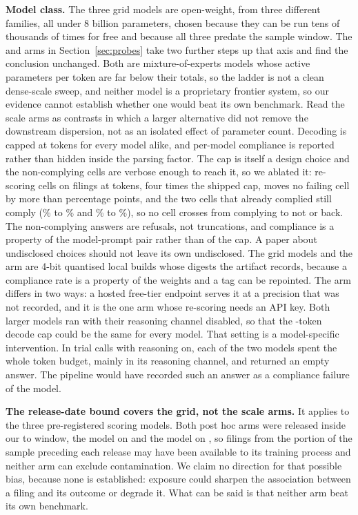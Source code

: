 \documentclass[sigconf]{acmart}
\begin{document}
\textbf{Model class.} The three grid models are open-weight, from three different families, all
under 8 billion parameters, chosen because they can be run tens of thousands of times for free and
because all three predate the sample window. The
\ScaleParams{} and \BigParams{} arms in Section~\ref{sec:probes} take two further steps up that axis
and find the conclusion unchanged. Both are mixture-of-experts models whose active parameters per
token are far below their totals, so the ladder is not a clean dense-scale sweep, and neither model
is a proprietary frontier system, so our evidence cannot establish whether one would beat its own
benchmark. Read the scale arms as contrasts in which a larger alternative did not remove the
downstream dispersion, not as an isolated effect of parameter count.
Decoding is capped at \NumPredict{} tokens for every model alike, and per-model compliance is
reported rather than hidden inside the parsing factor. The cap is itself a design choice and the
non-complying cells are verbose enough to reach it, so we ablated it: re-scoring \CapNumCells{}
cells on \CapProbeN{} filings at \CapProbeHigh{} tokens, four times the shipped cap,
moves no failing cell by more than \CapMaxMove{} percentage points, and the two cells that already
complied still comply (\CapControlLow{}\% to \CapControlHigh{}\% and \CapControlTwoLow{}\% to
\CapControlTwoHigh{}\%), so no cell crosses from complying to not or back. The non-complying answers
are refusals, not truncations, and compliance is a property of the model-prompt pair rather than of
the cap. A paper about undisclosed choices should not leave its own undisclosed. The grid models and the \ScaleParams{} arm
are 4-bit quantised local builds whose digests the artifact records, because a compliance rate is a
property of the weights and a tag can be repointed. The \BigParams{} arm differs in two ways: a
hosted free-tier endpoint serves it at a precision that was not recorded, and it is the one arm whose
re-scoring needs an API key. Both larger models ran with their reasoning channel disabled, so that
the \NumPredict{}-token decode cap could be the same for every model. That setting is a
model-specific intervention. In trial calls with reasoning on, each of the two models spent the whole
token budget, mainly in its reasoning channel, and returned an empty answer. The pipeline would have recorded
such an answer as a compliance failure of the model.

\textbf{The release-date bound covers the grid, not the scale arms.} It applies to the three
pre-registered scoring models. Both post hoc arms were released inside our \FirstSession{} to
\LastSession{} window, the \ScaleParams{} model on \ScaleRelease{} and the \BigParams{} model on
\BigRelease{}, so filings from the portion of the sample preceding each release may have been
available to its training process and neither arm can exclude contamination. We claim no direction
for that possible bias, because none is established: exposure could sharpen the association between
a filing and its outcome or degrade it. What can be said is that neither arm beat its own benchmark.
\end{document}
